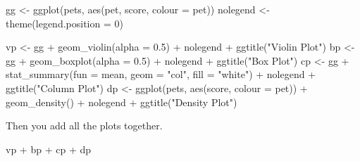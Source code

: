 \documentclass[
  oneside]{book}
\newenvironment{Shaded}{\begin{snugshade}}{\end{snugshade}}
\newcommand{\AttributeTok}[1]{\textcolor[rgb]{0.77,0.63,0.00}{#1}}
\newcommand{\DecValTok}[1]{\textcolor[rgb]{0.00,0.00,0.81}{#1}}
\newcommand{\FloatTok}[1]{\textcolor[rgb]{0.00,0.00,0.81}{#1}}
\newcommand{\FunctionTok}[1]{\textcolor[rgb]{0.00,0.00,0.00}{#1}}
\newcommand{\NormalTok}[1]{#1}
\newcommand{\OtherTok}[1]{\textcolor[rgb]{0.56,0.35,0.01}{#1}}
\newcommand{\SpecialCharTok}[1]{\textcolor[rgb]{0.00,0.00,0.00}{#1}}
\newcommand{\StringTok}[1]{\textcolor[rgb]{0.31,0.60,0.02}{#1}}
\begin{document}
\begin{Shaded}
\begin{Highlighting}[]
\NormalTok{gg }\OtherTok{\textless{}{-}} \FunctionTok{ggplot}\NormalTok{(pets, }\FunctionTok{aes}\NormalTok{(pet, score, }\AttributeTok{colour =}\NormalTok{ pet))}
\NormalTok{nolegend }\OtherTok{\textless{}{-}} \FunctionTok{theme}\NormalTok{(}\AttributeTok{legend.position =} \DecValTok{0}\NormalTok{)}

\NormalTok{vp }\OtherTok{\textless{}{-}}\NormalTok{ gg }\SpecialCharTok{+} \FunctionTok{geom\_violin}\NormalTok{(}\AttributeTok{alpha =} \FloatTok{0.5}\NormalTok{) }\SpecialCharTok{+}\NormalTok{ nolegend }\SpecialCharTok{+}
  \FunctionTok{ggtitle}\NormalTok{(}\StringTok{"Violin Plot"}\NormalTok{)}
\NormalTok{bp }\OtherTok{\textless{}{-}}\NormalTok{ gg }\SpecialCharTok{+} \FunctionTok{geom\_boxplot}\NormalTok{(}\AttributeTok{alpha =} \FloatTok{0.5}\NormalTok{) }\SpecialCharTok{+}\NormalTok{ nolegend }\SpecialCharTok{+}
  \FunctionTok{ggtitle}\NormalTok{(}\StringTok{"Box Plot"}\NormalTok{)}
\NormalTok{cp }\OtherTok{\textless{}{-}}\NormalTok{ gg }\SpecialCharTok{+} \FunctionTok{stat\_summary}\NormalTok{(}\AttributeTok{fun =}\NormalTok{ mean, }\AttributeTok{geom =} \StringTok{"col"}\NormalTok{, }\AttributeTok{fill =} \StringTok{"white"}\NormalTok{) }\SpecialCharTok{+}\NormalTok{ nolegend }\SpecialCharTok{+}
  \FunctionTok{ggtitle}\NormalTok{(}\StringTok{"Column Plot"}\NormalTok{)}
\NormalTok{dp }\OtherTok{\textless{}{-}} \FunctionTok{ggplot}\NormalTok{(pets, }\FunctionTok{aes}\NormalTok{(score, }\AttributeTok{colour =}\NormalTok{ pet)) }\SpecialCharTok{+} 
  \FunctionTok{geom\_density}\NormalTok{() }\SpecialCharTok{+}\NormalTok{ nolegend }\SpecialCharTok{+}
  \FunctionTok{ggtitle}\NormalTok{(}\StringTok{"Density Plot"}\NormalTok{)}
\end{Highlighting}
\end{Shaded}

Then you add all the plots together.

\begin{Shaded}
\begin{Highlighting}[]
\NormalTok{vp }\SpecialCharTok{+}\NormalTok{ bp }\SpecialCharTok{+}\NormalTok{ cp }\SpecialCharTok{+}\NormalTok{ dp}
\end{Highlighting}
\end{Shaded}
\end{document}
